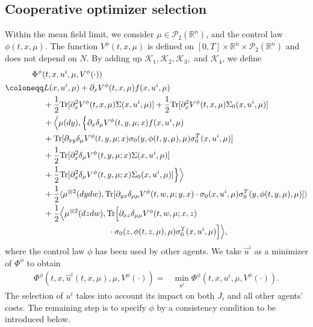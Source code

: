 \documentclass{amsart}
\theoremstyle{definition}
\theoremstyle{remark}
\def\cal{\mathcal}
\numberwithin{equation}{section}
\begin{document}
\subsection{Cooperative optimizer selection}

Within the mean field limit, we consider $\mu\in {\mathcal P}_2({\mathbb R}^n)$, and the control law $\phi(t, x, \mu)$.
The function $V^\phi(t, x, \mu)$
is defined on $[0,T]\times \mathbb{R}^n\times {\mathcal P}_2({\mathbb R}^n) $ and does not depend on $N$.
By adding up ${\cal K}_1, {\cal K}_2, {\cal K}_3, $ and ${\cal K}_4$, we define
\begin{align}
& \hskip -0.5cm \Phi^\phi(t, x, u^i,\mu,   V^\phi(\cdot) )\nonumber\\
  \coloneqq &   L(x, u^i, \mu)+
\partial_{x} V^\phi (t, x, \mu)
f(x, u^i, \mu)\nonumber\\
& + \frac{1}{2} {\rm Tr}
[\partial^2_{x} V^\phi(t, x, \mu) \Sigma  (x,u^i,\mu  ) ]+ \frac{1}{2} {\rm Tr}
[\partial^2_{x} V^\phi(t, x, \mu) \Sigma_0  (x,u^i,\mu  ) ] \nonumber \\
&+\Big\langle \mu(dy), \Big\{ \partial_{x} \delta_\mu V^\phi(t, y, \mu; x) f(x,  u^i,\mu) \nonumber  \\
& +{\rm Tr}[ \partial_{xy}\delta_\mu V^\phi(t,y,\mu;x)
\sigma_0(y, \phi(t,y,\mu),\mu)\sigma_0^T(x, u^i, \mu) ]\nonumber \\
& + \frac{1}{2} {\rm Tr} [\partial^2_{x} \delta_\mu V^\phi (t, y, \mu; x)\Sigma(x,u^i,\mu  )]\nonumber\\
& +  \frac{1}{2} {\rm Tr} [\partial^2_{x} \delta_\mu V^\phi (t, y, \mu; x)\Sigma_0(x,u^i,\mu  )]  \Big\}\Big\rangle \nonumber\\
&+\frac{1}{2}\langle \mu^{\otimes 2} (dydw),
{\rm Tr}[\partial_{yx}\delta_{\mu\mu} V^\phi (t, w, \mu; y,x) \cdot
\sigma_0(x,u^i,\mu)\sigma^T_0(y,\phi(t,y,\mu),\mu)]\rangle \nonumber \\
&+\frac{1}{2}\Big\langle \mu^{\otimes 2} (dzdw), {\rm Tr}\Big[\partial_{xz}\delta_{\mu\mu} V^\phi (t, w, \mu; x,z)\nonumber  \\
&\qquad\qquad\qquad\qquad \cdot \sigma_0(z,\phi(t,z,\mu),\mu)\sigma_0^T(x,u^i,\mu)\Big]\Big\rangle,\label{K123}
\end{align}
where the control law $\phi$ has been used by other agents.
We take $\hat u^i$ as a minimizer of $\Phi^\phi$ to obtain
\begin{align}
 \Phi^\phi (t, x, \hat u^i (t,x, \mu), \mu,  V^\phi(\cdot) )
=&\min_{u^i}\Phi^\phi ( t,x,u^i, \mu, V^\phi (\cdot)) .  \label{cpu}
\end{align}
The selection of $ u^i$ takes into account its impact on both $J_i$ and  all other agents' costs.
The remaining step is to specify $\phi$ by a consistency condition to be introduced below.
\end{document}
